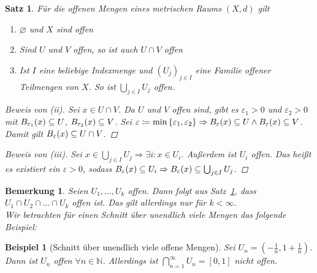\documentclass[11pt, twoside, a4paper]{article}
\theoremstyle{plain}
\newtheorem{bemerkung}[blockelement]{Bemerkung}
\newtheorem{satz}[blockelement]{Satz}
\newtheorem{beispiel}[blockelement]{Beispiel}
\numberwithin{equation}{subsection}
\newcommand{\set}[1]{\left\{#1\right\}}
\newcommand{\pair}[1]{\left(#1\right)}
\newcommand{\of}[1]{\mathopen{}\mathclose{}\bgroup\left(#1\aftergroup\egroup\right)}
\newcommand{\interv}[1]{\left[#1\right]}
\newcommand{\impl}[0]{\Rightarrow{}}
\renewcommand{\emptyset}{\varnothing}
\newcommand{\N}{\mathbb{N}}
\begin{document}
    \begin{satz} %
        \label{satz:offene-mengen-metr}
        Für die offenen Mengen eines metrischen Raums $\pair{X, d}$ gilt
        \begin{enumerate}[label=(\roman*)]
            \item $\emptyset$ und $X$ sind offen
            \item Sind $U$ und $V$ offen, so ist auch $U\cap V$ offen
            \item Ist $I$ eine beliebige Indexmenge und $(U_j)_{j\in I}$ eine Familie offener Teilmengen von $X$. So ist $\bigcup_{j\in I} U_j$ offen.
        \end{enumerate}

        \begin{proof}[Beweis von (ii)]
            Sei $x\in U\cap V$. Da $U$ und $V$ offen sind, gibt es $\varepsilon_1 > 0$ und $\varepsilon_2 > 0$ mit $B_{\varepsilon_1}\of{x}\subseteq U$, $B_{\varepsilon_2}\of{x}\subseteq V$. Sei $\varepsilon\coloneqq \min\set{\varepsilon_1, \varepsilon_2} \impl B_{\varepsilon}\of{x}\subseteq U\land B_{\varepsilon}\of{x}\subseteq V$. Damit gilt $B_{\varepsilon}\of{x}\subseteq U\cap V$.
        \end{proof}

        \begin{proof}[Beweis von (iii)]
            Sei $x\in \bigcup_{j\in I} U_j \impl \exists i\colon x\in U_{i}$. Außerdem ist $U_{i}$ offen. Das heißt es existiert ein $\varepsilon > 0$, sodass $B_{\varepsilon}\of{x}\subseteq U_{i} \impl B_{\varepsilon}\of{x}\subseteq \bigcup_{j\in I} U_{j}$.
        \end{proof}
    \end{satz}

    \begin{bemerkung}
        Seien $U_1, \ldots, U_k$ offen. Dann folgt aus Satz~\ref{satz:offene-mengen-metr}, dass $U_1\cap U_2\cap\dots\cap U_k$ offen ist. Das gilt allerdings nur für $k < \infty$.\\
        Wir betrachten für einen Schnitt über unendlich viele Mengen das folgende Beispiel:
    \end{bemerkung}

    \begin{beispiel}[Schnitt über unendlich viele offene Mengen]
        Sei $U_n = \pair{-\frac{1}{n}, 1+\frac{1}{n}}$. Dann ist $U_n$ offen $\forall n\in\N$. Allerdings ist $\bigcap_{n=1}^{\infty} U_n = \interv{0, 1}$ nicht offen.
    \end{beispiel}
\end{document}
